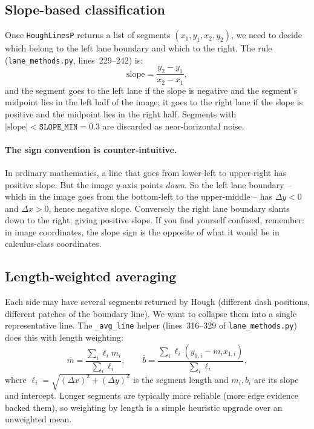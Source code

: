 \subsection{Slope-based classification}

Once \texttt{HoughLinesP} returns a list of segments
$(x_1,y_1,x_2,y_2)$, we need to decide which belong to the left lane
boundary and which to the right. The rule
(\texttt{lane\_methods.py}, lines~229--242) is:
\[
\text{slope} = \frac{y_2-y_1}{x_2-x_1},
\]
and the segment goes to the left lane if the slope is negative and the
segment's midpoint lies in the left half of the image; it goes to the
right lane if the slope is positive and the midpoint lies in the right
half. Segments with $|\text{slope}|<\texttt{SLOPE\_MIN}=0.3$ are
discarded as near-horizontal noise.

\paragraph{The sign convention is counter-intuitive.}
In ordinary mathematics, a line that goes from lower-left to
upper-right has positive slope. But the image $y$-axis points
\emph{down}. So the left lane boundary -- which in the image goes from
the bottom-left to the upper-middle -- has $\Delta y<0$ and
$\Delta x>0$, hence negative slope. Conversely the right lane boundary
slants down to the right, giving positive slope. If you find yourself
confused, remember: in image coordinates, the slope sign is the
opposite of what it would be in calculus-class coordinates.

\subsection{Length-weighted averaging}

Each side may have several segments returned by Hough (different dash
positions, different patches of the boundary line). We want to
collapse them into a single representative line. The
\texttt{\_avg\_line} helper (lines~316--329 of
\texttt{lane\_methods.py}) does this with length weighting:
\begin{equation}
\bar m = \frac{\sum_i \ell_i m_i}{\sum_i \ell_i},\qquad
\bar b = \frac{\sum_i \ell_i (y_{1,i} - m_i x_{1,i})}{\sum_i \ell_i},
\label{eq:lwavg}
\end{equation}
where $\ell_i = \sqrt{(\Delta x)^2 + (\Delta y)^2}$ is the segment
length and $m_i, b_i$ are its slope and intercept. Longer segments are
typically more reliable (more edge evidence backed them), so weighting
by length is a simple heuristic upgrade over an unweighted mean.

